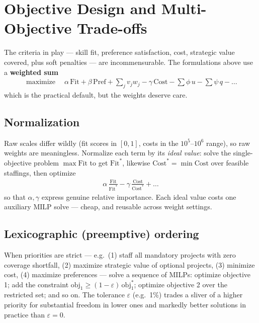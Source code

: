 \documentclass[11pt]{article}
\DeclareMathOperator*{\maximize}{maximize}
\theoremstyle{remark}
\begin{document}
\section{Objective Design and Multi-Objective Trade-offs}

The criteria in play --- skill fit, preference satisfaction, cost,
strategic value covered, plus soft penalties --- are incommensurable. The
formulations above use a \textbf{weighted sum}
\begin{align}
\maximize\quad
  \alpha\, \mathrm{Fit} + \beta\, \mathrm{Pref}
  + \sum_j v_j w_j - \gamma\, \mathrm{Cost}
  - \textstyle\sum \phi\, u - \textstyle\sum \psi\, q - \dots
\label{eq:weighted}
\end{align}
which is the practical default, but the weights deserve care.

\subsection{Normalization}
Raw scales differ wildly (fit scores in $[0,1]$, costs in the
$10^{5}$--$10^{6}$ range), so raw weights are meaningless. Normalize each
term by its \emph{ideal value}: solve the single-objective problem
$\max \mathrm{Fit}$ to get $\mathrm{Fit}^{*}$, likewise
$\mathrm{Cost}^{*} = \min \mathrm{Cost}$ over feasible staffings, then
optimize
\begin{align}
\alpha\, \frac{\mathrm{Fit}}{\mathrm{Fit}^{*}}
- \gamma\, \frac{\mathrm{Cost}}{\mathrm{Cost}^{*}} + \dots
\end{align}
so that $\alpha, \gamma$ express genuine relative importance. Each ideal
value costs one auxiliary MILP solve --- cheap, and reusable across
weight settings.

\subsection{Lexicographic (preemptive) ordering}
When priorities are strict --- e.g.\ (1) staff all mandatory projects with
zero coverage shortfall, (2) maximize strategic value of optional projects,
(3) minimize cost, (4) maximize preferences --- solve a sequence of MILPs:
optimize objective 1; add the constraint
$\text{obj}_1 \ge (1 - \varepsilon)\, \text{obj}_1^{*}$; optimize
objective 2 over the restricted set; and so on. The tolerance
$\varepsilon$ (e.g.\ 1\%) trades a sliver of a higher priority for
substantial freedom in lower ones and markedly better solutions in
practice than $\varepsilon = 0$.
\end{document}
